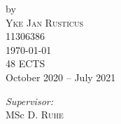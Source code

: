 \begin{titlepage}




by\\[0.2cm]

\textsc{\Large Yke Jan Rusticus}\\[0.2cm] %

11306386\\[1cm]










{\Large \today}\\[1cm] %



48 ECTS\\ %

October 2020 -- July 2021\\[1cm]%






\begin{minipage}[t]{0.4\textwidth}

\begin{flushleft} \large

\emph{Supervisor:} \\

MSc D. \textsc{Ruhe} %

\end{flushleft}

\end{minipage}

~

\begin{minipage}[t]{0.4\textwidth}

\begin{flushright} \large


\end{flushright}
\end{minipage}
\end{titlepage}
